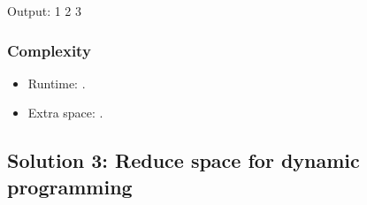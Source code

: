 \documentclass[letterpaper,12pt,english]{book}
\begin{document}
\begin{sphinxVerbatim}[commandchars=\\\{\}]
Output:
1
2
3
\end{sphinxVerbatim}


\subsubsection{Complexity}
\label{\detokenize{Dynamic_Programming/05_DP_509_Fibonacci_Number:id1}}\begin{itemize}
\item {} 
\sphinxAtStartPar
Runtime: .

\item {} 
\sphinxAtStartPar
Extra space: .

\end{itemize}


\subsection{Solution 3: Reduce space for dynamic programming}
\label{\detokenize{Dynamic_Programming/05_DP_509_Fibonacci_Number:solution-3-reduce-space-for-dynamic-programming}}
\end{document}

